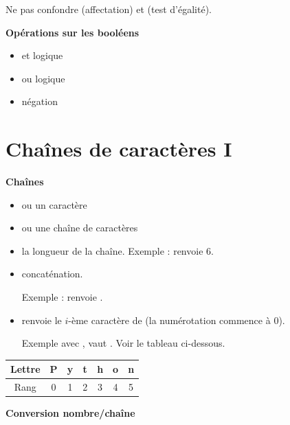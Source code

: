 \documentclass[11pt,class=report,crop=false]{standalone}
\begin{document}
 Ne pas confondre \og{}\fg{} (affectation) et \og{}\fg{} (test d'égalité).
  
\bigskip
  
\textbf{Opérations sur les booléens}
  \begin{itemize}
    \item {} \quad \og{}et\fg{} logique
    	\item {} \quad \og{}ou\fg{} logique
    	\item {} \quad négation
  \end{itemize} 
  
  
\section{Chaînes de caractères I}

\textbf{Chaînes}

\begin{itemize}
  \item {} \quad ou\quad {} \quad un caractère
  \item {}\quad ou\quad {} \quad une chaîne de caractères
  \item {}\quad la longueur de la chaîne. Exemple :  renvoie $6$.
  \item {}\quad concaténation. 
  
  Exemple :  renvoie .
  
  \item {}\quad renvoie le $i$-ème caractère de  (la numérotation commence à $0$). 
  
  Exemple avec ,  vaut . Voir le tableau ci-dessous.
\end{itemize}

\begin{center}
\begin{tabular}{|c||c|c|c|c|c|c|}
\hline
Lettre & \textbf{P} & \textbf{y} & \textbf{t} & \textbf{h} & \textbf{o} & \textbf{n} \\ \hline
Rang & 0 & 1 & 2 & 3 & 4 & 5 \\ \hline
\end{tabular}
\end{center}


\textbf{Conversion nombre/chaîne}
\end{document}
